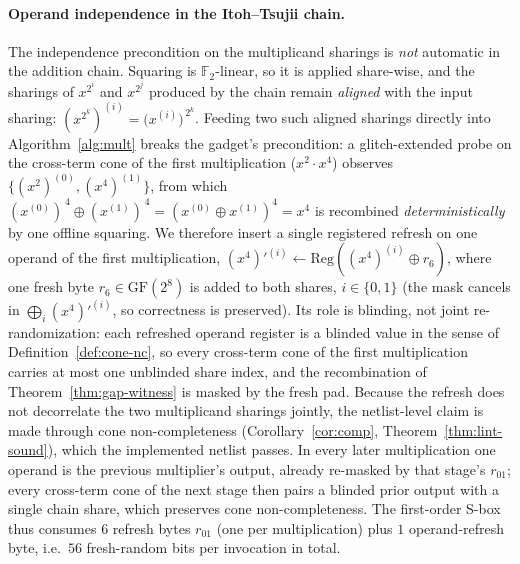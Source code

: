 \documentclass[lettersize,journal]{IEEEtran}
\newcommand{\GF}{\mathrm{GF}}
\newcommand{\share}[2]{#1^{(#2)}}
\begin{document}
\paragraph{Operand independence in the Itoh--Tsujii chain.}
The independence precondition on the multiplicand sharings is \emph{not}
automatic in the addition chain.  Squaring is $\mathbb{F}_2$-linear, so it
is applied share-wise, and the sharings of $x^{2^i}$ and $x^{2^j}$ produced
by the chain remain \emph{aligned} with the input sharing:
$\share{(x^{2^k})}{i}=\bigl(\share{x}{i}\bigr)^{\,2^k}$.  Feeding two such aligned
sharings directly into Algorithm~\ref{alg:mult} breaks the gadget's
precondition: a glitch-extended probe on the cross-term cone of the first
multiplication ($x^{2}{\cdot}x^{4}$) observes
$\{\share{(x^{2})}{0},\share{(x^{4})}{1}\}$, from which
$(\share{x}{0})^{\,4}\oplus(\share{x}{1})^{\,4}=(\share{x}{0}\oplus
\share{x}{1})^{4}=x^{4}$ is recombined \emph{deterministically} by one
offline squaring.  We therefore insert a single registered refresh on one operand of the first
multiplication,
$\share{(x^{4})'}{i}\leftarrow\mathrm{Reg}(\share{(x^{4})}{i}\oplus r_6)$,
where one fresh byte $r_6\in\GF(2^8)$ is added to both shares, $i\in\{0,1\}$
(the mask cancels in $\bigoplus_i\share{(x^{4})'}{i}$, so correctness is
preserved). Its role is blinding, not joint re-randomization: each refreshed
operand register is a blinded value in the sense of
Definition~\ref{def:cone-nc}, so every cross-term cone of the first
multiplication carries at most one unblinded share index, and the
recombination of Theorem~\ref{thm:gap-witness} is masked by the fresh pad.
Because the refresh does not decorrelate the two multiplicand sharings
jointly, the netlist-level claim is made through cone non-completeness
(Corollary~\ref{cor:comp}, Theorem~\ref{thm:lint-sound}), which the
implemented netlist passes.
In every later multiplication one operand is the previous multiplier's
output, already re-masked by that stage's $r_{01}$; every cross-term cone of
the next stage then pairs a blinded prior output with a single chain share,
which preserves cone non-completeness.  The first-order S-box thus consumes
$6$ refresh bytes $r_{01}$ (one per multiplication) plus $1$ operand-refresh
byte, i.e.\ $56$ fresh-random bits per invocation in total.
\end{document}
